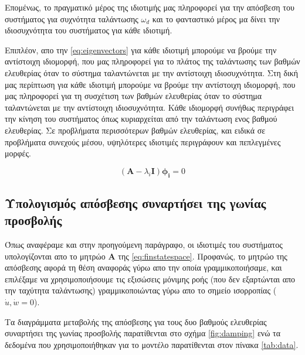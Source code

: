 Επομένως, το πραγματικό μέρος της ιδιοτιμής μας πληροφορεί για την απόσβεση του συστήματος για συχνότητα ταλάντωσης $\omega_d$ και το φανταστικό μέρος μα δίνει την ιδιοσυχνότητα του συστήματος για κάθε ιδιοτιμή. 

\noindent Επιπλέον, απο την \cref{eq:eigenvectors} για κάθε ιδιοτιμή μπορούμε να βρούμε την αντίστοιχη ιδιομορφή, που μας πληροφορεί για το πλάτος της ταλάντωσης των βαθμών ελευθερίας όταν το σύστημα ταλαντώνεται με την αντίστοιχη ιδιοσυχνότητα. Στη δική μας περίπτωση  για κάθε ιδιοτιμή μπορούμε να βρούμε την αντίστοιχη ιδιομορφή, που μας πληροφορεί για τη συσχέτιση των βαθμών ελευθερίας όταν το σύστημα ταλαντώνεται με την αντίστοιχη ιδιοσυχνότητα. Κάθε ιδιομορφή συνήθως περιγράφει την κίνηση του συστήματος όπως κυριαρχείται από την ταλάντωση ενος βαθμού ελευθερίας. Σε προβλήματα περισσότερων βαθμών ελευθερίας, και ειδικά σε προβλήματα συνεχούς μέσου, υψηλότερες ιδιοτιμές περιγράφουν και πεπλεγμένες μορφές.

\begin{equation}
    (\mathbf{A}-\lambda_i\mathbf{I})\mathbf{\phi_i}=0
    \label{eq:eigenvectors}
\end{equation}

\subsection{Υπολογισμός απόσβεσης συναρτήσει της γωνίας προσβολής}

Όπως αναφέραμε και στην προηγούμενη παράγραφο, οι ιδιοτιμές του συστήματος υπολογίζονται απο το μητρώο \textbf{A} της \cref{eq:finstatespace}. Προφανώς, το μητρώο της απόσβεσης αφορά τη θέση αναφοράς γύρω απο την οποία γραμμικοποιήσαμε, και επιλέξαμε να χρησιμοποιήσουμε τις εξισώσεις μόνιμης ροής (που δεν εξαρτώνται απο την ταχύτητα ταλάντωσης) γραμμικοποιώντας γύρω απο το σημείο ισορροπίας ($\dot{u},\dot{w}=0$). 

\noindent Τα διαγράμματα μεταβολής της απόσβεσης για τους δυο βαθμούς ελευθερίας συναρτήσει της γωνίας προσβολής παρατίθενται στο σχήμα \ref{fig:damping} ενώ τα δεδομένα που χρησιμοποιήθηκαν για το μοντέλο παρατίθενται στον πίνακα \ref{tab:data}.

